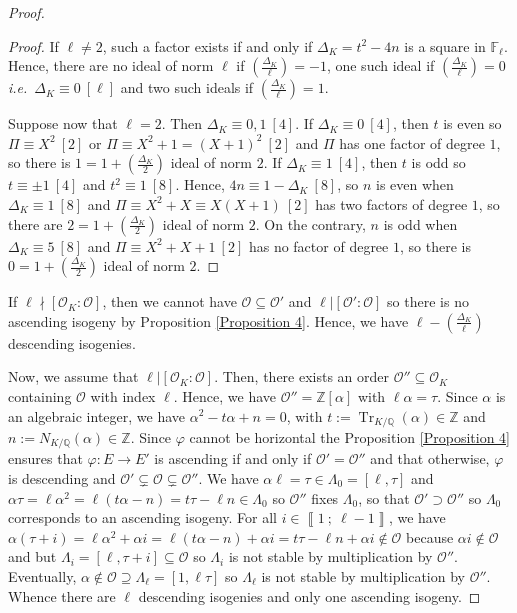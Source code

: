\documentclass[a4paper,10pt,notitlepage]{report}
\theoremstyle{definition}
\theoremstyle{plain}
\theoremstyle{definition}
\newcommand{\ie}{\emph{i.e.}\ }
\newcommand{\Z}{\mathbb{Z}}
\newcommand{\Q}{\mathbb{Q}}
\newcommand{\F}{\mathbb{F}}
\newcommand{\mO}{\mathcal{O}}
\renewcommand{\i}[2]{\left\llbracket #1~;~#2\right\rrbracket}
\renewcommand{\(}{\left(}
\renewcommand{\)}{\right)}
\DeclareMathOperator{\Tr}{Tr}
\begin{document}
\begin{proof}
\begin{proof}
If $\ell\neq 2$, such a factor exists if and only if $\Delta_K=t^2-4n$ is a square in $\F_\ell$. Hence, there are no ideal of norm $\ell$ if $\(\frac{\Delta_K}{\ell}\)=-1$, one such ideal if $\(\frac{\Delta_K}{\ell}\)=0$ \ie $\Delta_K\equiv 0 \ [\ell]$ and two such ideals if $\(\frac{\Delta_K}{\ell}\)=1$. 

Suppose now that $\ell=2$. Then $\Delta_K\equiv 0, 1 \ [4]$. If $\Delta_K\equiv 0 \ [4]$, then $t$ is even so $\Pi\equiv X^2 \ [2]$ or $\Pi\equiv X^2+1=(X+1)^2 \ [2]$ and $\Pi$ has one factor of degree $1$, so there is $1=1+\(\frac{\Delta_K}{2}\)$ ideal of norm $2$. If $\Delta_K\equiv 1 \ [4]$, then $t$ is odd so $t\equiv \pm 1 \ [4]$ and $t^2\equiv 1 \ [8]$. Hence, $4n\equiv 1-\Delta_K \ [8]$, so $n$ is even when $\Delta_K\equiv 1 \ [8]$ and $\Pi\equiv X^2+X\equiv X(X+1) \ [2]$ has two factors of degree $1$, so there are $2=1+\(\frac{\Delta_K}{2}\)$ ideal of norm $2$.  On the contrary, $n$ is odd when $\Delta_K\equiv 5 \ [8]$ and $\Pi\equiv X^2+X+1\ [2]$ has no factor of degree $1$, so there is $0=1+\(\frac{\Delta_K}{2}\)$ ideal of norm $2$.
\end{proof}

If $\ell\nmid [\mO_K:\mO]$, then we cannot have $\mO\subseteq\mO'$ and $\ell|[\mO':\mO]$ so there is no ascending isogeny by Proposition \ref{Proposition 4}. Hence, we have $\ell-\(\frac{\Delta_K}{\ell}\)$ descending isogenies.

Now, we assume that $\ell|[\mO_K:\mO]$. Then, there exists an order $\mO''\subseteq \mO_K$ containing $\mO$ with index $\ell$. Hence, we have $\mO''=\Z[\alpha]$ with $\ell\alpha=\tau$.  Since $\alpha$ is an algebraic integer, we have $\alpha^2-t\alpha+n=0$, with $t:=\Tr_{K/\Q}(\alpha)\in \Z$ and $n:=N_{K/\Q}(\alpha)\in \Z$. Since $\varphi$ cannot be horizontal the Proposition \ref{Proposition 4} ensures that $\varphi:E\longrightarrow E'$ is ascending if and only if $\mO'=\mO''$ and that otherwise, $\varphi$ is descending and $\mO'\subsetneq \mO\subsetneq \mO''$.  We have $\alpha\ell=\tau\in\Lambda_0=[\ell,\tau]$ and $\alpha\tau=\ell\alpha^2=\ell(t\alpha-n)=t\tau-\ell n\in \Lambda_0$ so $\mO''$ fixes $\Lambda_0$, so that $\mO'\supset\mO''$ so $\Lambda_0$ corresponds to an ascending isogeny.  For all $i\in\i{1}{\ell-1}$, we have $\alpha(\tau+i)=\ell\alpha^2+\alpha i=\ell(t\alpha-n)+\alpha i=t\tau-\ell n+\alpha i\not\in\mO$ because $\alpha i\not\in\mO$ and but $\Lambda_i=[\ell,\tau+i]\subseteq\mO$ so $\Lambda_i$ is not stable by multiplication by $\mO''$.  Eventually,  $\alpha\not\in \mO\supseteq \Lambda_\ell=[1,\ell\tau]$ so $\Lambda_\ell$ is not stable by multiplication by $\mO''$. Whence there are $\ell$ descending isogenies and only one ascending isogeny.


\end{proof}
\end{document}
